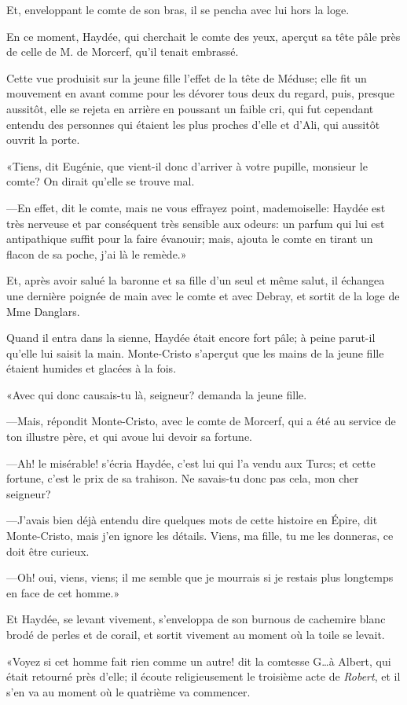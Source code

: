 Et, enveloppant le comte de son bras, il se pencha avec lui hors la loge. 

En ce moment, Haydée, qui cherchait le comte des yeux, aperçut sa tête pâle près de celle de M. de Morcerf, qu'il tenait embrassé. 

Cette vue produisit sur la jeune fille l'effet de la tête de Méduse; elle fit un mouvement en avant comme pour les dévorer tous deux du regard, puis, presque aussitôt, elle se rejeta en arrière en poussant un faible cri, qui fut cependant entendu des personnes qui étaient les plus proches d'elle et d'Ali, qui aussitôt ouvrit la porte. 

«Tiens, dit Eugénie, que vient-il donc d'arriver à votre pupille, monsieur le comte? On dirait qu'elle se trouve mal. 

—En effet, dit le comte, mais ne vous effrayez point, mademoiselle: Haydée est très nerveuse et par conséquent très sensible aux odeurs: un parfum qui lui est antipathique suffit pour la faire évanouir; mais, ajouta le comte en tirant un flacon de sa poche, j'ai là le remède.» 

Et, après avoir salué la baronne et sa fille d'un seul et même salut, il échangea une dernière poignée de main avec le comte et avec Debray, et sortit de la loge de Mme Danglars.  

Quand il entra dans la sienne, Haydée était encore fort pâle; à peine parut-il qu'elle lui saisit la main. Monte-Cristo s'aperçut que les mains de la jeune fille étaient humides et glacées à la fois. 

«Avec qui donc causais-tu là, seigneur? demanda la jeune fille. 

—Mais, répondit Monte-Cristo, avec le comte de Morcerf, qui a été au service de ton illustre père, et qui avoue lui devoir sa fortune. 

—Ah! le misérable! s'écria Haydée, c'est lui qui l'a vendu aux Turcs; et cette fortune, c'est le prix de sa trahison. Ne savais-tu donc pas cela, mon cher seigneur? 

—J'avais bien déjà entendu dire quelques mots de cette histoire en Épire, dit Monte-Cristo, mais j'en ignore les détails. Viens, ma fille, tu me les donneras, ce doit être curieux. 

—Oh! oui, viens, viens; il me semble que je mourrais si je restais plus longtemps en face de cet homme.» 

Et Haydée, se levant vivement, s'enveloppa de son burnous de cachemire blanc brodé de perles et de corail, et sortit vivement au moment où la toile se levait. 

«Voyez si cet homme fait rien comme un autre! dit la comtesse G\dots à Albert, qui était retourné près d'elle; il écoute religieusement le troisième acte de \textit{Robert}, et il s'en va au moment où le quatrième va commencer. 